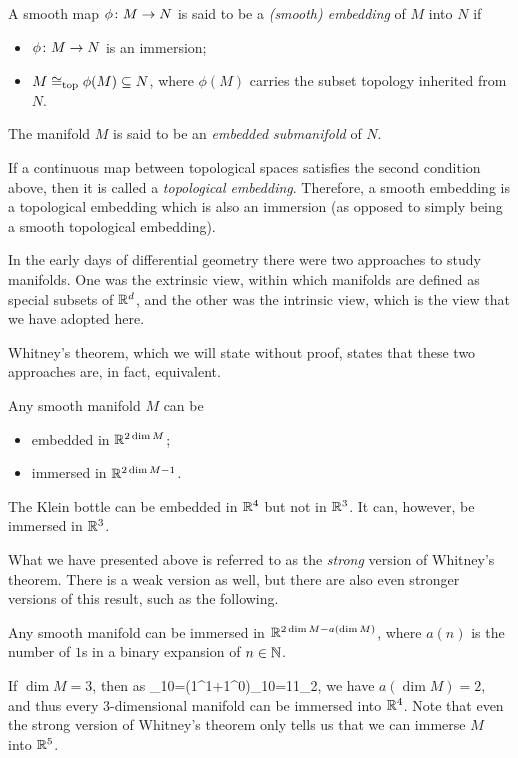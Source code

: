 \bd
A smooth map $\phi\colon M \to N$ is said to be a \emph{(smooth) embedding} of $M$ into $N$ if
\begin{itemize}
\item $\phi\colon M\to N$ is an immersion;
\item $M \cong_{\mathrm{top}}\phi(M)\subseteq N$, where $\phi(M)$ carries the subset topology inherited from $N$.
\end{itemize}
The manifold $M$ is said to be an \emph{embedded submanifold} of $N$.
\ed

\br
If a continuous map between topological spaces satisfies the second condition above, then it is called a \emph{topological embedding}. Therefore, a smooth embedding is a topological embedding which is also an immersion (as opposed to simply being a smooth topological embedding).
\er

In the early days of differential geometry there were two approaches to study manifolds. One was the extrinsic view, within which manifolds are defined as special subsets of $\mathbb{R}^d$, and the other was the intrinsic view, which is the view that we have adopted here.

Whitney's theorem, which we will state without proof, states that these two approaches are, in fact, equivalent.

\begin{theorem}[Whitney]
Any smooth manifold $M$ can be
\begin{itemize}
\item embedded in $\mathbb{R}^{2\dim M}$;
\item immersed in $\mathbb{R}^{2\dim M-1}$.
\end{itemize}
\end{theorem}

\be
The Klein bottle can be embedded in $\mathbb{R}^4$ but not in $\mathbb{R}^3$. It can, however, be immersed in $\mathbb{R}^3$.
\ee

What we have presented above is referred to as the \emph{strong} version of Whitney's theorem. There is a weak version as well, but there are also even stronger versions of this result, such as the following.

\begin{theorem}
Any smooth manifold can be immersed in $\mathbb{R}^{2\dim M-a(\dim M)}$, where $a(n)$ is the number of $1$s in a binary expansion of $n\in \mathbb{N}$.
\end{theorem}

\be
If $\dim M = 3$, then as 
_{10}=(1^1+1^0)_{10}=11_2,
\ese
we have $a(\dim M)=2$, and thus every $3$-dimensional manifold can be immersed into $\mathbb{R}^4$. Note that even the strong version of Whitney's theorem only tells us that we can immerse $M$ into $\mathbb{R}^5$.
\ee

